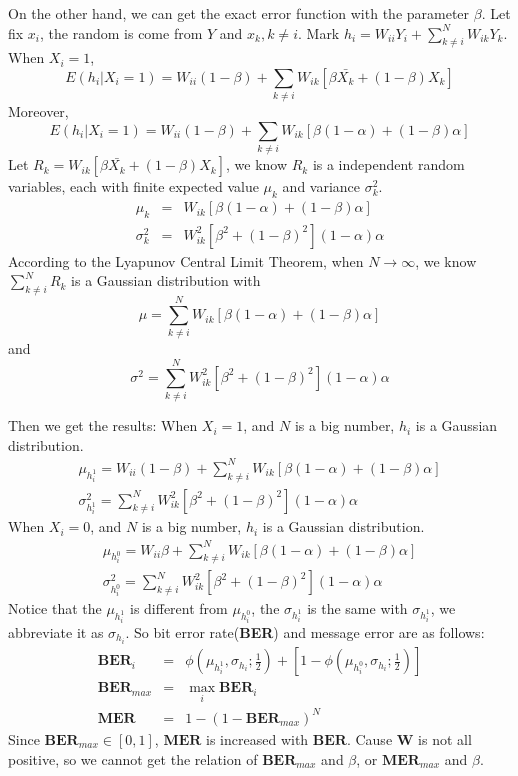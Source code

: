 On the other hand, we can get the exact error function with the parameter $\beta$.
Let fix $x_i$, the random is come from $Y$ and $x_k, k \neq i$. Mark $h_i = W_{ii}Y_i + \sum_{k \neq i}^N W_{ik}Y_k$. When $X_i = 1$, $$E(h_i|X_i = 1) = W_{ii}(1 - \beta) + \sum_{k \neq i}W_{ik} [\beta \bar{X_k} + (1 - \beta) X_k]$$
Moreover, $$E(h_i|X_i = 1) = W_{ii}(1 - \beta) + \sum_{k \neq i}W_{ik} [\beta (1 - \alpha) + (1 - \beta) \alpha]$$
Let $R_k = W_{ik}[\beta \bar{X_k} + (1 - \beta)X_k]$, we know $R_k$ is a independent random variables, each with finite expected value $\mu_k$ and variance $\sigma_k^2$.
\begin{eqnarray*}
  \mu_k &=& W_{ik}[\beta (1 - \alpha) + (1 - \beta) \alpha] \\
  \sigma_k^2 &=& W_{ik}^2 [\beta^2 + (1 - \beta)^2](1 - \alpha)\alpha
\end{eqnarray*}
According to the Lyapunov Central Limit Theorem, when $N \rightarrow \infty$, we know $\sum_{k \neq i}^N R_{k}$ is a Gaussian distribution with $$\mu = \sum_{k \neq i}^N W_{ik}[\beta (1 - \alpha) + (1 - \beta) \alpha]$$
and $$\sigma^2 = \sum_{k \neq i}^N W_{ik}^2 [\beta^2 + (1 - \beta)^2](1 - \alpha)\alpha$$

Then we get the results: When $X_i = 1$, and $N$ is a big number, $h_i$ is a Gaussian distribution.
    \begin{eqnarray*}
      \mu_{h_i^1} = W_{ii}(1 - \beta) + \sum_{k \neq i}^N W_{ik}[\beta (1 - \alpha) + (1 - \beta) \alpha] \\
      \sigma_{h_i^1}^2 = \sum_{k \neq i}^N W_{ik}^2 [\beta^2 + (1 - \beta)^2](1 - \alpha)\alpha
    \end{eqnarray*}
When $X_i = 0$, and $N$ is a big number, $h_i$ is a Gaussian distribution.
    \begin{eqnarray*}
      \mu_{h_i^0} = W_{ii} \beta + \sum_{k \neq i}^N W_{ik}[\beta (1 - \alpha) + (1 - \beta) \alpha] \\
      \sigma_{h_i^0}^2 = \sum_{k \neq i}^N W_{ik}^2 [\beta^2 + (1 - \beta)^2](1 - \alpha)\alpha
    \end{eqnarray*}
Notice that the $\mu_{h_i^1}$ is different from $\mu_{h_i^0}$, the $\sigma_{h_i^1}$ is the same with $\sigma_{h_i^1}$, we abbreviate it as $\sigma_{h_i}$. 
So bit error rate(\textbf{BER}) and message error are as follows:
    \begin{eqnarray*}
      \textbf{BER}_i &=& \phi(\mu_{h_i^1}, \sigma_{h_i};\frac{1}{2}) + [1 - \phi(\mu_{h_i^0}, \sigma_{h_i}; \frac{1}{2})] \\
      \textbf{BER}_{max} &=& \max_{i} \textbf{BER}_i \\
      \textbf{MER} &=& 1 - (1 - \textbf{BER}_{max})^N
    \end{eqnarray*}
Since $\textbf{BER}_{max} \in [0, 1]$, $\textbf{MER}$ is increased with $\textbf{BER}$. 
Cause $\textbf{W}$ is not all positive, so we cannot get the relation of $\textbf{BER}_{max}$ and $\beta$, or $\textbf{MER}_{max}$ and $\beta$.

